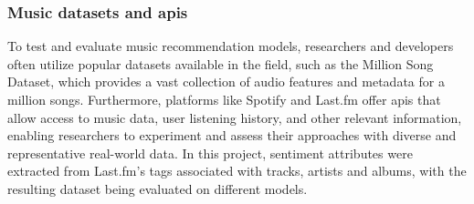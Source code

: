 \subsubsection{Music datasets and \acs{api}s}

To test and evaluate music recommendation models, researchers and developers often utilize popular datasets available in the field, such as the Million Song Dataset, which provides a vast collection of audio features and metadata for a million songs. Furthermore, platforms like Spotify and Last.fm offer \acs{api}s that allow access to music data, user listening history, and other relevant information, enabling researchers to experiment and assess their approaches with diverse and representative real-world data. In this project, sentiment attributes were extracted from Last.fm's tags associated with tracks, artists and albums, with the resulting dataset being evaluated on different models.
